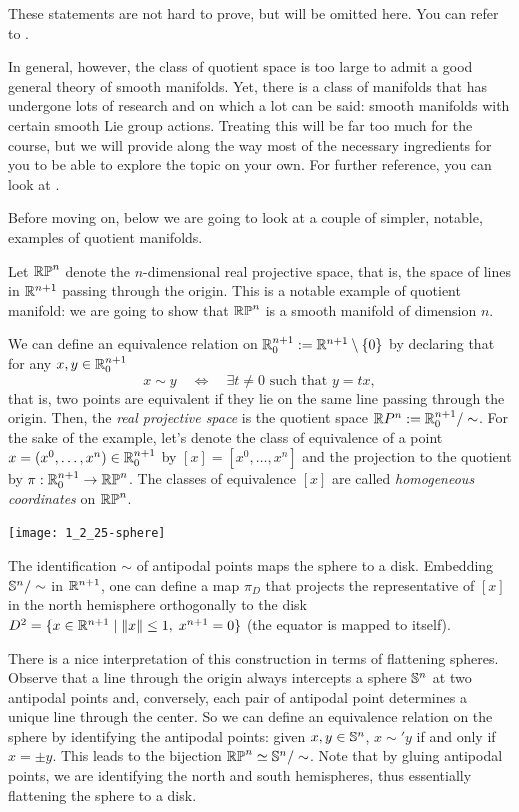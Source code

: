 These statements are not hard to prove, but will be omitted here.
You can refer to \cite[Chapters 7.1--7.5]{book:tu}.

In general, however, the class of quotient space is too large to admit a good general theory of smooth manifolds.
Yet, there is a class of manifolds that has undergone lots of research and on which a lot can be said: smooth manifolds with certain smooth Lie group actions.
Treating this will be far too much for the course, but we will provide along the way most of the necessary ingredients for you to be able to explore the topic on your own.
For further reference, you can look at \cite[Chapter 21]{book:lee}.

Before moving on, below we are going to look at a couple of simpler, notable, examples of quotient manifolds.

\begin{example}
  Let $\mathbb{RP}^n$ denote the $n$-dimensional real projective space, that is, the space of lines in $\mathbb{R}^{n+1}$ passing through the origin.
  This is a notable example of quotient manifold: we are going to show that $\mathbb{RP}^n$ is a smooth manifold of dimension $n$. 

  We can define an equivalence relation on $\mathbb{R}^{n+1}_0:=\mathbb{R}^{n+1}\setminus\{0\}$ by declaring that for any $x,y\in \mathbb{R}^{n+1}_0$
  \begin{equation}
    x\sim y \quad\Longleftrightarrow\quad \exists t\neq 0 \mbox{ such that } y=tx,
  \end{equation}
  that is, two points are equivalent if they lie on the same line passing through the origin.
  Then, the \emph{real projective space} is the quotient space $\mathbb{R} P^n := \mathbb{R}^{n+1}_0/\sim$.
  For the sake of the example, let's denote the class of equivalence of a point $x=(x^0,\ldots,x^n)\in\mathbb{R}^{n+1}_0$ by $[x]=[x^0,\ldots,x^n]$ and the projection to the quotient by $\pi:\mathbb{R}^{n+1}_0\to\mathbb{RP}^n$.
  The classes of equivalence $[x]$ are called \emph{homogeneous coordinates} on $\mathbb{RP}^n$.
  
  \begin{marginfigure}
    \texttt{[image: 1\_2\_25-sphere]}
    \caption{The identification $\sim$ of antipodal points maps the sphere to a disk. Embedding $\mathbb{S}^n/\sim$ in $\mathbb{R}^{n+1}$, one can define a map $\pi_D$ that projects the representative of $[x]$ in the north hemisphere orthogonally to the disk $D^2 = \{x\in\mathbb{R}^{n+1} \mid \|x\|\leq 1, \; x^{n+1}=0\}$ (the equator is mapped to itself). }
  \end{marginfigure}
  There is a nice interpretation of this construction in terms of flattening spheres.
  Observe that a line through the origin always intercepts a sphere $\mathbb{S}^n$ at two antipodal points and, conversely, each pair of antipodal point determines a unique line through the center.
  So we can define an equivalence relation on the sphere by identifying the antipodal points: given $x,y\in\mathbb{S}^n$, $x\sim' y$ if and only if $x = \pm y$.
  This leads to the bijection $\mathbb{RP}^n \simeq \mathbb{S}^n/\sim$.
  Note that by gluing antipodal points, we are identifying the north and south hemispheres, thus essentially flattening the sphere to a disk.


\end{example}
